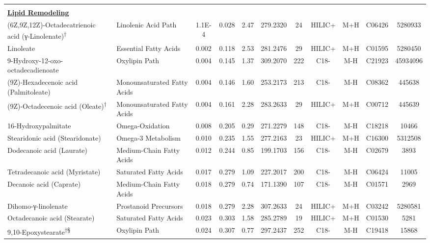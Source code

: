 \begin{longtable}[t]{llccccccccc}
 &  &  &  &  &  &  &  &  &  & \\
\fontsize{9pt}{10.8pt}\selectfont\textbf{\underline{Lipid Remodeling}} &  &  &  &  &  &  &  &  &  & \\
\hspace*{0.3cm}(6Z,9Z,12Z)-Octadecatrienoic acid (γ-Linolenate)\textsuperscript{†} & Linolenic Acid Path & 1.1E-4 & 0.028 & 2.47 & 279.2320 & 24 & HILIC+ & M+H & C06426 & 5280933\\
\hspace*{0.3cm}Linoleate & Essential Fatty Acids & 0.002 & 0.118 & 2.53 & 281.2476 & 29 & HILIC+ & M+H & C01595 & 5280450\\
\hspace*{0.3cm}9-Hydroxy-12-oxo-octadecadienoate & Oxylipin Path & 0.004 & 0.145 & 1.37 & 309.2070 & 222 & C18- & M-H & C21923 & 45934096\\

\hspace*{0.3cm}(9Z)-Hexadecenoic acid (Palmitoleate) & Monounsaturated Fatty Acids & 0.004 & 0.146 & 1.60 & 253.2173 & 213 & C18- & M-H & C08362 & 445638\\
\hspace*{0.3cm}(9Z)-Octadecenoic acid (Oleate)\textsuperscript{†} & Monounsaturated Fatty Acids & 0.004 & 0.161 & 2.28 & 283.2633 & 29 & HILIC+ & M+H & C00712 & 445639\\
\hspace*{0.3cm}16-Hydroxypalmitate & Omega-Oxidation & 0.008 & 0.205 & 0.29 & 271.2279 & 148 & C18- & M-H & C18218 & 10466\\
\hspace*{0.3cm}Stearidonic acid (Stearidonate) & Omega-3 Metabolism & 0.010 & 0.235 & 1.55 & 277.2163 & 23 & HILIC+ & M+H & C16300 & 5312508\\
\hspace*{0.3cm}Dodecanoic acid (Laurate) & Medium-Chain Fatty Acids & 0.012 & 0.244 & 0.85 & 199.1703 & 156 & C18- & M-H & C02679 & 3893\\

\hspace*{0.3cm}Tetradecanoic acid (Myristate) & Saturated Fatty Acids & 0.017 & 0.279 & 1.09 & 227.2017 & 200 & C18- & M-H & C06424 & 11005\\
\hspace*{0.3cm}Decanoic acid (Caprate) & Medium-Chain Fatty Acids & 0.018 & 0.279 & 0.74 & 171.1390 & 107 & C18- & M-H & C01571 & 2969\\
\hspace*{0.3cm}Dihomo-γ-linolenate & Prostanoid Precursors & 0.018 & 0.279 & 2.28 & 307.2633 & 24 & HILIC+ & M+H & C03242 & 5280581\\
\hspace*{0.3cm}Octadecanoic acid (Stearate) & Saturated Fatty Acids & 0.023 & 0.303 & 1.58 & 285.2789 & 19 & HILIC+ & M+H & C01530 & 5281\\
\hspace*{0.3cm}9,10-Epoxystearate\textsuperscript{†}\textsuperscript{§} & Oxylipin Path & 0.024 & 0.307 & 0.77 & 297.2437 & 252 & C18- & M-H & C19418 & 15868\\


\end{longtable}
